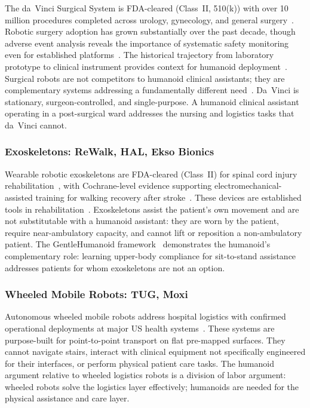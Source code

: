 The da~Vinci Surgical System is FDA-cleared (Class~II, 510(k)) with over 10
million procedures completed across urology, gynecology, and general
surgery~\cite{lanfranco2004robotic,sheetz2020robotic}. Robotic surgery adoption
has grown substantially over the past decade, though adverse event analysis
reveals the importance of systematic safety monitoring even for established
platforms~\cite{alemzadeh2016adverse}. The historical trajectory from laboratory
prototype to clinical instrument provides context for humanoid
deployment~\cite{camarillo2004robotic}. Surgical robots are not competitors to
humanoid clinical assistants; they are complementary systems addressing a
fundamentally different need~\cite{morgan2022robots}. Da~Vinci is stationary, surgeon-controlled, and single-purpose.
A humanoid clinical assistant operating in a post-surgical ward addresses the
nursing and logistics tasks that da~Vinci cannot.

\subsubsection{Exoskeletons: ReWalk, HAL, Ekso Bionics}

Wearable robotic exoskeletons are FDA-cleared (Class~II) for spinal cord injury
rehabilitation~\cite{esquenazi2012rewalk}, with Cochrane-level evidence supporting
electromechanical-assisted training for walking recovery after
stroke~\cite{mehrholz2017electromechanical}.
These devices are established tools in rehabilitation~\cite{sorensen2025humanoid}. Exoskeletons assist the patient's own
movement and are not substitutable with a humanoid assistant: they are worn by
the patient, require near-ambulatory capacity, and cannot lift or reposition a
non-ambulatory patient. The GentleHumanoid framework~\cite{lu2025gentlehumanoid}
demonstrates the humanoid's complementary role: learning upper-body compliance
for sit-to-stand assistance addresses patients for whom exoskeletons are not an
option.

\subsubsection{Wheeled Mobile Robots: TUG, Moxi}

Autonomous wheeled mobile robots address hospital logistics with confirmed
operational deployments at major US health systems~\cite{huang2023intelligent,morgan2022robots}.
These systems are purpose-built for point-to-point transport on flat pre-mapped
surfaces. They cannot navigate stairs, interact with clinical equipment not
specifically engineered for their interfaces, or perform physical patient care
tasks. The humanoid argument relative to wheeled logistics robots is a division
of labor argument: wheeled robots solve the logistics layer effectively;
humanoids are needed for the physical assistance and care layer.

